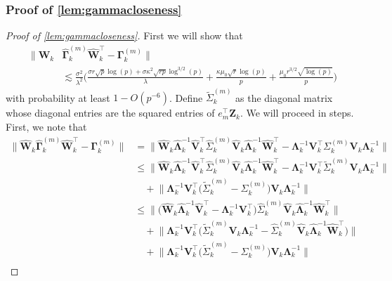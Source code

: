 \documentclass[10pt]{article}
\newcommand{\0}{{\mathbf{0}}}
\newcommand{\1}{{\mathbf{1}}}
\renewcommand{\t}{^{\top}}
\newcommand{\inv}{^{-1}}
\renewcommand{\tilde}{\widetilde}
\renewcommand{\hat}{\widehat}
\renewcommand{\hat}{\widehat}
\begin{document}
\subsubsection{Proof of \cref{lem:gammacloseness}}
\begin{proof}[Proof of \cref{lem:gammacloseness}]
First we will show that
\begin{align*}
        \| \mathbf{\hat W}_k &\mathbf{\hat \Gamma}^{(m)}_k \mathbf{\hat W}_k\t - \mathbf{\Gamma}^{(m)}_k \|\\
        &\lesssim \frac{\sigma^2}{\lambda^2} \bigg( \frac{\sigma r \sqrt{p}\log(p) + \sigma \kappa^2 \sqrt{rp} \log^{3/2}(p)}{\lambda} + \frac{\kappa \mu_0 \sqrt{r} \log(p)}{p} + \frac{\mu_0 r^{3/2} \sqrt{\log(p)}}{p} \bigg)
\end{align*}
with probability at least $1 - O(p^{-6})$. Define $\tilde \Sigma^{(m)}_k$ as the diagonal matrix whose diagonal entries are the squared entries of $e_m\t \mathbf{Z}_k$.  We will proceed in steps. First, we note that
\begin{align*}
   \bigg\|  \mathbf{\hat W}_k\mathbf{\hat \Gamma}^{(m)}_k  \mathbf{\hat W}_k\t - \mathbf{\Gamma}^{(m)}_k  \bigg\| &= \bigg\|   \mathbf{\hat W}_k\mathbf{\hat{\Lambda}}_k\inv \mathbf{\hat V}_k\t \hat \Sigma^{(m)}_k \mathbf{\hat V}_k \mathbf{\hat{\Lambda}}_k\inv \mathbf{\hat W}_k\t - \mathbf{\Lambda}_k\inv \mathbf{V}_k\t \Sigma^{(m)}_k \mathbf{V}_k \mathbf{\Lambda}_k\inv \bigg\| \\
   &\leq\bigg\|   \mathbf{\hat W}_k\mathbf{\hat{\Lambda}}_k\inv \mathbf{\hat V}_k\t \hat \Sigma^{(m)}_k \mathbf{\hat V}_k \mathbf{\hat{\Lambda}}_k\inv \mathbf{\hat W}_k\t - \mathbf{\Lambda}_k\inv \mathbf{V}_k\t  \tilde \Sigma^{(m)}_k \mathbf{V}_k \mathbf{\Lambda}_k\inv \bigg\| \\
   &\quad + \bigg\|   \mathbf{\Lambda}_k\inv \mathbf{V}_k\t\bigg( \tilde \Sigma^{(m)}_k - \Sigma^{(m)}_k \bigg)\mathbf{V}_k \mathbf{\Lambda}_k\inv \bigg\| \\
   &\leq \bigg\| \bigg( \mathbf{\hat W}_k \mathbf{\hat{\Lambda}}_k\inv \mathbf{\hat V}_k\t - \mathbf{\Lambda}_k\inv \mathbf{V}_k\t \bigg) \hat \Sigma^{(m)}_k \mathbf{\hat V}_k \mathbf{\hat{\Lambda}}_k\inv \mathbf{\hat W}_k\t \bigg\| \\
   &\quad + \bigg\| \mathbf{\Lambda}_k\inv \mathbf{V}_k\t \bigg( \tilde \Sigma^{(m)}_k \mathbf{V}_k \mathbf{\Lambda}_k\inv - \hat \Sigma^{(m)}_k \mathbf{\hat V}_k \mathbf{\hat{\Lambda}}_k\inv \mathbf{\hat W}_k\t \bigg) \bigg\| \\
   &\quad + \bigg\|   \mathbf{\Lambda}_k\inv \mathbf{V}_k\t\bigg( \tilde \Sigma^{(m)}_k - \Sigma^{(m)}_k \bigg)\mathbf{V}_k \mathbf{\Lambda}_k\inv \bigg\| \\

\end{align*}
\end{proof}
\end{document}

